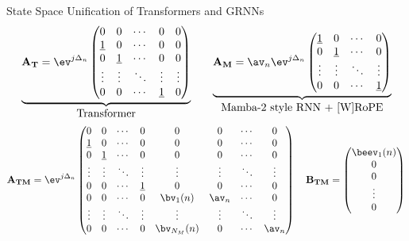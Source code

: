 
\begin{slide}[\slideopts,toc={Unified State Space}]{State Space Unification of Transformers and GRNNs}
\vspace{-1em}
\begin{equation*}
\begin{array}{cc}
\underbrace{
\mathbf{A_T} = \ev^{j\Delta_n} \begin{pmatrix}
0 & 0 & \cdots & 0 & 0 \\
\onevec & 0 & \cdots & 0 & 0 \\
0 & \onevec & \cdots & 0 & 0 \\
\vdots & \vdots & \ddots & \vdots & \vdots \\
0 & 0 & \cdots & \onevec & 0
\end{pmatrix}
}_{\mbox{Transformer}}
&\quad
\underbrace{
\mathbf{A_M} = \av_n \ev^{j\Delta_n} \begin{pmatrix}
\onevec & 0 & \cdots & 0 \\
0 & \onevec & \cdots & 0 \\
\vdots & \vdots & \ddots & \vdots \\
0 & 0 & \cdots & \onevec
\end{pmatrix}
}_{\mbox{Mamba-2 style RNN + [W]RoPE}}
\end{array}
\end{equation*}
\[
\mathbf{A_{TM}} = \ev^{j\Delta_n} \begin{pmatrix}
0 & 0 & \cdots & 0 & 0 & 0 & \cdots & 0 \\
\onevec & 0 & \cdots & 0 & 0 & 0 & \cdots & 0 \\
0 & \onevec & \cdots & 0 & 0 & 0 & \cdots & 0 \\
\vdots & \vdots & \ddots & \vdots & \vdots & \vdots & \ddots & \vdots \\
0 & 0 & \cdots & \onevec & 0 & 0 & \cdots & 0 \\
0 & 0 & \cdots & 0 & \bv_{1}(n) & \av_n & \cdots & 0 \\
\vdots & \vdots & \ddots & \vdots & \vdots & \vdots & \ddots & \vdots \\
0 & 0 & \cdots & 0 & \bv_{N_M}(n) & 0 & \cdots & \av_n
\end{pmatrix}
\quad
\mathbf{B_{TM}} = \begin{pmatrix} \beev_1(n) \\ 0 \\ 0 \\ \vdots \\ 0 \end{pmatrix}
\]

\end{slide}

